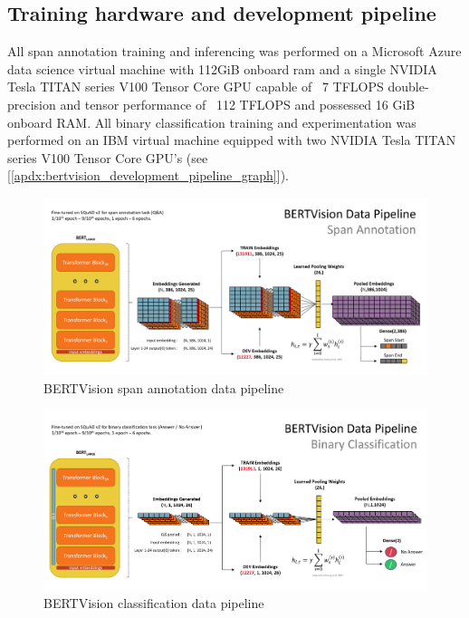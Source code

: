\subsection{Training hardware and development pipeline}
\label{apdx:training_hardware}

All span annotation training and inferencing was performed on a Microsoft Azure data science virtual machine with 112GiB onboard ram and a single NVIDIA Tesla TITAN series V100 Tensor Core GPU capable of ~7 TFLOPS double-precision and tensor performance of ~112 TFLOPS and possessed 16 GiB onboard RAM.  All binary classification training and experimentation was performed on an IBM virtual machine equipped with two NVIDIA Tesla TITAN series V100 Tensor Core GPU's (see [\ref{apdx:bertvision_development_pipeline_graph}]).

\newpage
\newpage

\begin{figure}[t]
	\centering
	\includegraphics[width=\textwidth]{images/Data_Pipeline_Span_Annotation.png}%
	\caption{BERTVision span annotation data pipeline}
	\label{apdx:bertvision_span_annotation_data_pipeline_graph}
\end{figure}

\begin{figure}[!h]
	\centering
	\includegraphics[width=\textwidth]{images/Data_Pipeline_Binary_Classification.png}%
	\caption{BERTVision classification data pipeline}
	\label{apdx:bertvision_classification_data_pipeline_graph}
\end{figure}

